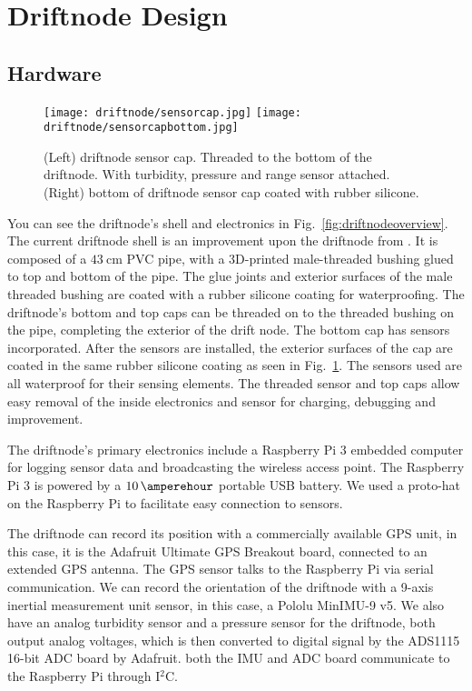 \section[Design]{Driftnode Design}

\subsection[Hardware]{Hardware}

\begin{figure}[h]
	\begin{center}
	\texttt{[image: driftnode/sensorcap.jpg]}
	\texttt{[image: driftnode/sensorcapbottom.jpg]}
	\caption[Driftnode]{
		(Left) driftnode sensor cap. Threaded to the bottom of the driftnode. With turbidity, pressure and range sensor attached.
		(Right) bottom of driftnode sensor cap coated with rubber silicone.
	} \label{fig:sensorcap}
	\end{center}
	\vspace{-1em}
\end{figure}

You can see the driftnode's shell and electronics in Fig.~\ref{fig:driftnodeoverview}.
The current driftnode shell is an improvement upon the driftnode from \cite{drifterUSC}.
It is composed of a $\SI{43}{\centi\metre}$ PVC pipe, with a 3D-printed male-threaded bushing glued to top and bottom of the pipe.
The glue joints and exterior surfaces of the male threaded bushing are coated with a rubber silicone coating for waterproofing.
The driftnode's bottom and top caps can be threaded on to the threaded bushing on the pipe, completing the exterior of the drift node.
The bottom cap has sensors incorporated.
After the sensors are installed, the exterior surfaces of the cap are coated in the same rubber silicone coating as seen in Fig.~\ref{fig:sensorcap}.
The sensors used are all waterproof for their sensing elements.
The threaded sensor and top caps allow easy removal of the inside electronics and sensor for charging, debugging and improvement.

The driftnode's primary electronics include a Raspberry Pi 3 embedded computer for logging sensor data and broadcasting the wireless access point.
The Raspberry Pi 3 is powered by a $\SI{10}{\amperehour}$ portable USB battery.
We used a proto-hat on the Raspberry Pi to facilitate easy connection to sensors.

The driftnode can record its position with a commercially available GPS unit, in this case, it is the Adafruit Ultimate GPS Breakout board, connected to an extended GPS antenna.
The GPS sensor talks to the Raspberry Pi via serial communication.
We can record the orientation of the driftnode with a 9-axis inertial measurement unit sensor, in this case, a Pololu MinIMU-9 v5.
We also have an analog turbidity sensor and a pressure sensor for the driftnode, both output analog voltages, which is then converted to digital signal by the ADS1115 16-bit ADC board by Adafruit.
both the IMU and ADC board communicate to the Raspberry Pi through I$^{2}$C.


